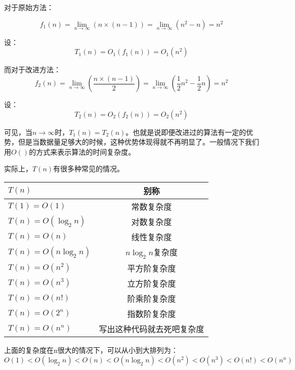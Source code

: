 对于原始方法：

\begin{equation}
f_1(n)=\lim_{n\to\infty}(n\times(n-1))=\lim_{n\to\infty}(n^2-n)=n^2
\end{equation}

设：
\begin{equation}
T_1(n)=O_1(f_1(n))=O_1(n^2)
\end{equation}

而对于改进方法：
\begin{equation}
f_2(n)=\lim_{n\to\infty}(\frac{n\times(n-1)}{2})=\lim_{n\to\infty}(\frac{1}{2}n^2-\frac{1}{2}n)=n^2
\end{equation}

设：
\begin{equation}
T_2(n)=O_2(f_2(n))=O_2(n^2)
\end{equation}

可见，当$n\to\infty$时，$T_1(n)=T_2(n)$。也就是说即便改进过的算法有一定的优势，但是当数据量足够大的时候，这种优势体现得就不再明显了。一般情况下我们用$O()$的方式来表示算法的时间复杂度。

实际上，$T(n)$有很多种常见的情况。

\begin{center}
	\begin{tabular}{|l|c|}
		\hline
			$T(n)$ & 别称 \\
		\hline
			$T(1)=O(1)$ & 常数复杂度\\
			$T(n)=O(\log_{2}n)$ & 对数复杂度\\
			$T(n)=O(n)$ & 线性复杂度\\
			$T(n)=O(n\log_{2}n)$ & $n\log_{2}n$复杂度\\
			$T(n)=O(n^2)$ & 平方阶复杂度\\
			$T(n)=O(n^3)$ & 立方阶复杂度\\
			$T(n)=O(n!)$ & 阶乘阶复杂度\\
			$T(n)=O(2^n)$ & 指数阶复杂度\\
			$T(n)=O(n^n)$ & 写出这种代码就去死吧复杂度\\
		\hline
	\end{tabular}
\end{center}

上面的复杂度在n很大的情况下，可以从小到大排列为：$O(1)<O(\log_{2}n)<O(n)<O(n\log_{2}n)<O(n^2)<O(n^3)<O(n!)<O(n^n)$



